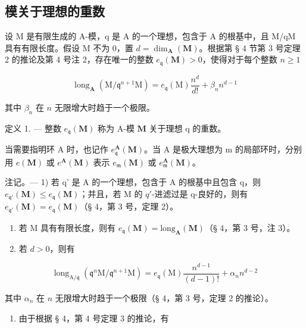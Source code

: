 \subsection{模关于理想的重数}

设 M 是有限生成的 A-模，q 是 A 的一个理想，包含于 A 的根基中，且 M/qM 具有有限长度。假设 M 不为 0，置 \(d = \dim_{\mathbf{A}}(\mathbf{M})\)。根据第 § 4 节第 3 号定理 2 的推论及第 4 号注 2，存在唯一的整数 \(e_{\mathfrak{q}}(\mathbf{M}) > 0\)，使得对于每个整数 \(n \geqslant 1\)

\[
\operatorname{long} _ {\mathbf {A}} (\mathrm{M} / \mathfrak {q} ^ {n + 1} \mathrm{M}) = e _ {\mathfrak {q}} (\mathrm{M}) \frac {n ^ {d}}{d !} + \beta_ {n} n ^ {d - 1}
\]

其中 \(\beta_{n}\) 在 \(n\) 无限增大时趋于一个极限。

定义 1. --- 整数 \(e_{\mathfrak{q}}(\mathbf{M})\) 称为 A-模 \(\mathbf{M}\) 关于理想 q 的重数。

当需要指明环 A 时，也记作 \(e_{\mathfrak{q}}^{\mathbf{A}}(\mathbf{M})\)。当 A 是极大理想为 m 的局部环时，分别用 \(e(\mathbf{M})\) 或 \(e^{\mathbf{A}}(\mathbf{M})\) 表示 \(e_{\mathfrak{m}}(\mathbf{M})\) 或 \(e_{\mathfrak{m}}^{\mathbf{A}}(\mathbf{M})\)。

注记。--- 1) 若 q' 是 A 的一个理想，包含于 A 的根基中且包含 q，则 \(e_{\mathfrak{q}'}(\mathbf{M}) \leqslant e_{\mathfrak{q}}(\mathbf{M})\)；并且，若 M 的 \(q'\)-进滤过是 q-良好的，则有 \(e_{\mathfrak{q}'}(\mathbf{M}) = e_{\mathfrak{q}}(\mathbf{M})\)（§ 4，第 3 号，定理 2）。

\begin{enumerate}
\def\labelenumi{\arabic{enumi})}
\setcounter{enumi}{1}
\item
  若 M 具有有限长度，则有 \(e_{\mathfrak{q}}(\mathbf{M}) = \mathrm{long}_{\mathbf{A}}(\mathbf{M})\)（§ 4，第 3 号，注 3）。
\item
  若 \(d > 0\)，则有
\end{enumerate}

\[
\operatorname{long} _ {\mathrm{A} / \mathfrak {q}} (\mathfrak {q} ^ {n} \mathrm{M} / \mathfrak {q} ^ {n + 1} \mathrm{M}) = e _ {\mathfrak {q}} (\mathrm{M}) \frac {n ^ {d - 1}}{(d - 1) !} + \alpha_ {n} n ^ {d - 2}
\]

其中 \(\alpha_{n}\) 在 \(n\) 无限增大时趋于一个极限（§ 4，第 3 号，定理 2 的推论）。

\begin{enumerate}
\def\labelenumi{\arabic{enumi})}
\setcounter{enumi}{3}
\tightlist
\item
  由于根据 § 4，第 4 号定理 3 的推论，有
\end{enumerate}


